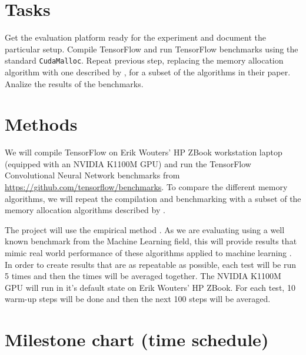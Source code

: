 \documentclass[12pt,twoside]{article}
\begin{document}
\section{Tasks}
\label{sec:tasks}


Get the evaluation platform ready for the experiment and document the particular setup.
Compile TensorFlow and run TensorFlow benchmarks using the standard \texttt{CudaMalloc}.
Repeat previous step, replacing the memory allocation algorithm with one described by \citeauthor{Vinkler2015} \cite{Vinkler2015}, for a subset of the algorithms in their paper.
Analize the results of the benchmarks.

\section{Methods}
\label{sec:methods}


We will compile TensorFlow on Erik Wouters' HP ZBook workstation laptop (equipped with an NVIDIA K1100M GPU) and run the TensorFlow Convolutional Neural Network benchmarks from \url{https://github.com/tensorflow/benchmarks}. To compare the different memory algorithms, we will repeat the compilation and benchmarking with a subset of the memory allocation algorithms described by \citeauthor{Vinkler2015} \cite{Vinkler2015}.

The project will use the empirical method \cite{bock2001}. As we are evaluating using a well known benchmark from the Machine Learning field, this will provide results that mimic real world performance of these algorithms applied to machine learning \cite{abadi2016}. In order to create results that are as repeatable as possible, each test will be run 5 times and then the times will be averaged together. The NVIDIA K1100M GPU will run in it's default state on Erik Wouters' HP ZBook. For each test, 10 warm-up steps will be done and then the next 100 steps will be averaged.

\section{Milestone chart (time schedule)}
\label{sec:milestone-chart}
\end{document}
